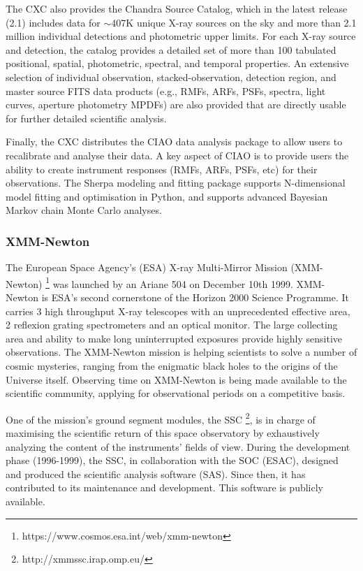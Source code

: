 \documentclass[11pt,a4paper]{ivoa}
\begin{document}
The CXC also provides the Chandra Source Catalog, which in the latest release (2.1) includes data for $\sim$407K unique
X-ray sources on the sky and more than 2.1 million individual detections and photometric upper limits. For each X-ray
source and detection, the catalog provides a detailed set of more than 100 tabulated positional, spatial, photometric,
spectral, and temporal properties. An extensive selection of individual observation, stacked-observation, detection
region, and master source FITS data products (e.g., RMFs, ARFs, PSFs, spectra, light curves, aperture photometry MPDFs)
are also provided that are directly usable for further detailed scientific analysis.

Finally, the CXC distributes the CIAO data analysis package to allow users to recalibrate and analyse their data. A key
aspect of CIAO is to provide users the ability to create instrument responses (RMFs, ARFs, PSFs, etc) for their
observations. The Sherpa modeling and fitting package supports N-dimensional model fitting and optimisation in Python,
and supports advanced Bayesian Markov chain Monte Carlo analyses.

\subsubsection{XMM-Newton}

The European Space Agency's (ESA) X-ray Multi-Mirror Mission (XMM-Newton) \footnote{https://www.cosmos.esa.int/web/xmm-newton}
was launched by an Ariane 504 on December 10th 1999. XMM-Newton is ESA's second cornerstone of the Horizon 2000 Science Programme.
It carries 3 high throughput X-ray telescopes with an unprecedented effective area, 2 reflexion grating spectrometers and an optical monitor.
The large collecting area and ability to make long uninterrupted exposures provide highly sensitive observations.
The XMM-Newton mission is helping scientists to solve a number of cosmic mysteries, ranging from the enigmatic black holes
to the origins of the Universe itself. Observing time on XMM-Newton is being made available to the scientific community,
applying for observational periods on a competitive basis.

One of the mission's ground segment modules, the SSC \footnote{http://xmmssc.irap.omp.eu/}, is in charge of maximising the scientific return of
this space observatory by exhaustively analyzing
the content of the instruments' fields of view. During the development phase (1996-1999), the SSC,
in collaboration with the SOC (ESAC), designed and produced the scientific analysis software (SAS).
Since then, it has contributed to its maintenance and development. This software is publicly available.
\end{document}
